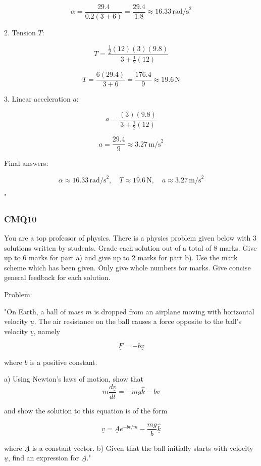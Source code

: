 \[
\alpha = \frac{29.4}{0.2(3 + 6)} = \frac{29.4}{1.8} \approx 16.33\,\text{rad/s}^2
\]

2. Tension $T$:

\[
T = \frac{\frac{1}{2}(12)(3)(9.8)}{3 + \frac{1}{2}(12)}
\]

\[
T = \frac{6(29.4)}{3 + 6} = \frac{176.4}{9} \approx 19.6\,\text{N}
\]

3. Linear acceleration $a$:

\[
a = \frac{(3)(9.8)}{3 + \frac{1}{2}(12)}
\]

\[
a = \frac{29.4}{9} \approx 3.27\,\text{m/s}^2
\]

Final answers:

\[
\boxed{\alpha \approx 16.33\,\text{rad/s}^2, \quad T \approx 19.6\,\text{N}, \quad a \approx 3.27\,\text{m/s}^2}
\]

"

\subsubsection{CMQ10}

You are a top professor of physics. There is a physics problem given below with 3 solutions written by students. Grade each solution out of a total of 8 marks. Give up to 6 marks for part a) and give up to 2 marks for part b). Use the mark scheme which has been given. Only give whole numbers for marks. Give concise general feedback for each solution.

Problem:

"On Earth, a ball of mass \( m \) is dropped from an airplane moving with horizontal velocity \( \underline{u} \). The air resistance on the ball causes a force opposite to the ball's velocity \( \underline{v} \), namely 

\[ \underline{F} = - b \underline{v} \] 
    
where \( b \) is a positive constant. 
    
a) Using Newton's laws of motion, show that 
\[
m\frac{d\underline{v}}{dt} = - mg \hat{\underline{k}} - b\underline{v} 
\]
    
and show the solution to this equation is of the form 
    
\[
\underline{v} = \underline{A} e^{-bt/m} - \frac{mg}{b} \hat{\underline{k}} 
\]
    
where \( \underline{A} \) is a constant vector.
    b) Given that the ball initially starts with velocity \( \underline{u} \), find an expression for \( \underline{A} \)."

